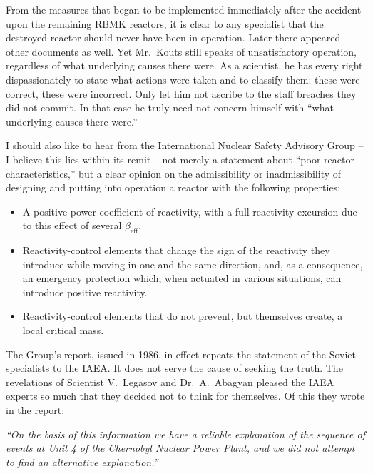 \documentclass[openright]{bookest}
\begin{document}
From the measures that began to be implemented immediately after the accident upon the remaining RBMK reactors, it is clear to any specialist that the destroyed reactor should never have been in operation. Later there appeared other documents as well. Yet Mr.~Kouts still speaks of unsatisfactory operation, regardless of what underlying causes there were. As a scientist, he has every right dispassionately to state what actions were taken and to classify them: these were correct, these were incorrect. Only let him not ascribe to the staff breaches they did not commit. In that case he truly need not concern himself with ``what underlying causes there were.''

I should also like to hear from the International Nuclear Safety Advisory Group -- I believe this lies within its remit -- not merely a statement about ``poor reactor characteristics,'' but a clear opinion on the admissibility or inadmissibility of designing and putting into operation a reactor with the following properties:

\begin{itemize}
\item A positive power coefficient of reactivity, with a full reactivity excursion due to this effect of several $\beta_{\mathrm{eff}}$.
\item Reactivity-control elements that change the sign of the reactivity they introduce while moving in one and the same direction, and, as a consequence, an emergency protection which, when actuated in various situations, can introduce positive reactivity.
\item Reactivity-control elements that do not prevent, but themselves create, a local critical mass.
\end{itemize}

The Group's report, issued in 1986, in effect repeats the statement of the Soviet specialists to the IAEA. It does not serve the cause of seeking the truth. The revelations of Scientist V.~Legasov and Dr.~A.~Abagyan pleased the IAEA experts so much that they decided not to think for themselves. Of this they wrote in the report:

\begin{personal}
\textit{``On the basis of this information we have a reliable explanation of the sequence of events at Unit 4 of the Chernobyl Nuclear Power Plant, and we did not attempt to find an alternative explanation.''}
\end{personal}
\end{document}
